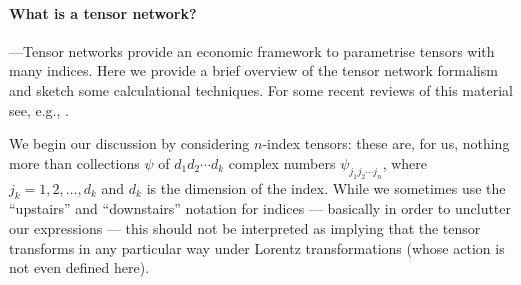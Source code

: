 \documentclass[prl,twocolumn,lengthcheck,superscriptaddress]{revtex4-1}
\theoremstyle{definition}
\theoremstyle{remark}
\begin{document}
\paragraph{What is a tensor network?}\hspace{-1em}---Tensor networks provide an economic framework to parametrise tensors with many indices. Here we provide a brief overview of the tensor network formalism and sketch some calculational techniques. For some recent reviews of this material see, e.g., \cite{orus:2013a, evenbly:2011a, evenbly:2009a}.

We begin our discussion by considering $n$-index tensors: these are, for us, nothing more than collections $\psi$ of $d_1d_2\cdots d_k$ complex numbers $\psi_{j_1j_2\cdots j_n}$, where $j_k = 1, 2, \ldots, d_k$ and  $d_k$ is the dimension of the index. While we sometimes use the ``upstairs'' and ``downstairs'' notation for indices --- basically in order to unclutter our expressions --- this should not be interpreted as implying that the tensor transforms in any particular way under Lorentz transformations (whose action is not even defined here).
\end{document}

